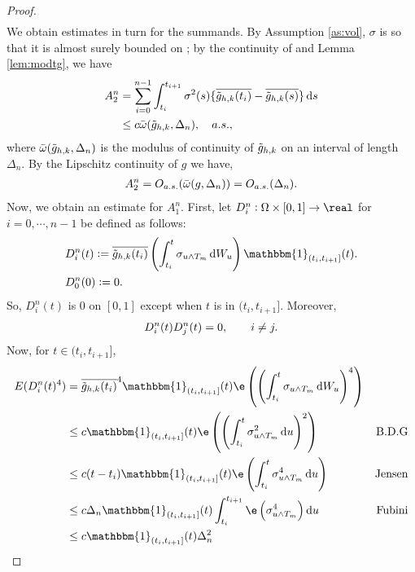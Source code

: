 \begin{proof}
\begin{align}
  \label{}
\end{align}
We obtain estimates in turn for the summands. By Assumption \ref{as:vol}, $\sigma$ is \cadlag so that it is almost surely  bounded on \domain;  by the continuity of \tghk   and Lemma \eqref{lem:modtg}, we have 
\begin{align}
  A_{2}^n &= \sumin \int_{t_i}^{t_{i+1}} \sigma^2(s)  \{\btghki - \btghks\} \D s\notag\\
  &\le c\modc{\tghk}{\Delta_n},\quad a.s.,\notag
  \label{}
\end{align}
where ${\bar{\omega}}({\tilde{g}_{h,k}},\Delta_n)$ is the modulus of continuity of $\tilde{g}_{h,k}$ on an interval of length $\Delta_n$.  By the Lipschitz continuity of $g$ we have, 
\begin{align}
  A_{2}^n = O_{a.s.}({\bar{\omega}}({g},\Delta_n)) = O_{a.s.}( \Delta_n). \notag 
  \label{}
\end{align}
Now, we obtain an estimate for $A_{1}^n$.
First, let $D_i^n: \Omega\times[0,1] \to \real$ for $i = 0, \cdots, n-1$ be defined as follows:  
\begin{align}
&D_{i}^n(t) := \btghki\left(\int_{t_i}^{t} \sigma_{u \wedge T_m}\D W_u\right)\mathbbm{1}_{(t_i, t_{i+1}]}(t).
  \label{eq:Di}\\
&D_0^n(0) := 0.
\end{align}
So, $D_i^n(t)$ is 0 on $[0,1]$ except when $t$ is in $(t_i, t_{i+1}]$. Moreover,  
\begin{align}
  D_i^n (t) D_j^n(t) = 0, \qquad i \not = j.\notag
  \label{}
\end{align}
Now, for $t \in (t_i, t_{i+1}]$,
\begin{align}
E(D_i^n(t)^4) &= \btghki^4\mathbbm{1}_{(t_i, t_{i+1}]}(t)\e\left( \left(\int_{t_i}^{t} \sigma_{u\wedge T_m}\D W_u\right)^4\right)& \notag\\
& \le c\mathbbm{1}_{(t_i, t_{i+1}]}(t)\e\left( \left(\int_{t_i}^{t} \sigma_{u\wedge T_m}^2\D u\right)^2\right) &\text{B.D.G}\notag\\
& \le c(t - t_i)\mathbbm{1}_{(t_i, t_{i+1}]}(t) \e \left(\int_{t_i}^{t} \sigma_{u\wedge T_m}^4\D u\right)&\text{Jensen}\notag\\
  & \le c\Delta_n\mathbbm{1}_{(t_i, t_{i+1}]}(t)\int_{t_i}^{t_{i+1}} \e\left(\sigma_{u\wedge T_m}^4\right) \D u &\text{Fubini}\notag \\
  & \le c \mathbbm{1}_{(t_i, t_{i+1}]}(t)\Delta_n^2 &

\end{align}
\end{proof}
